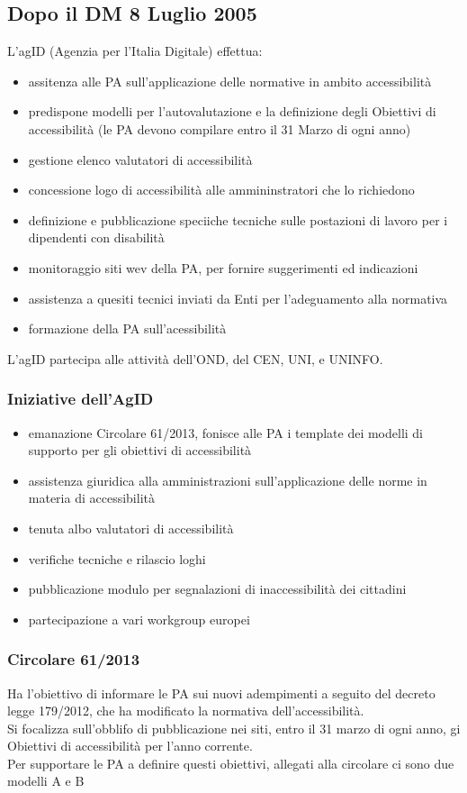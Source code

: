 \documentclass{article}
\begin{document}
\subsection{Dopo il DM 8 Luglio 2005}
L'agID (Agenzia per l'Italia Digitale) effettua:
\begin{itemize}
	\item assitenza alle PA sull'applicazione delle normative in ambito accessibilità
	\item predispone modelli per l'autovalutazione e la definizione degli Obiettivi di accessibilità (le PA devono compilare entro il 31 Marzo di ogni anno)
	\item gestione elenco valutatori di accessibilità
	\item concessione logo di accessibilità alle ammininstratori che lo richiedono
	\item definizione e pubblicazione speciiche tecniche sulle postazioni di lavoro per i dipendenti con disabilità
	\item monitoraggio siti wev della PA, per fornire suggerimenti ed indicazioni
	\item assistenza a quesiti tecnici inviati da Enti per l'adeguamento alla normativa
	\item formazione della PA sull'acessibilità
\end{itemize}
L'agID partecipa alle attività dell'OND, del CEN, UNI, e UNINFO.
\subsubsection{Iniziative dell'AgID}
\begin{itemize}
	\item emanazione Circolare 61/2013, fonisce alle PA i template dei modelli di supporto per gli obiettivi di accessibilità
	\item assistenza giuridica alla amministrazioni sull'applicazione delle norme in materia di accessibilità
	\item tenuta albo valutatori di accessibilità
	\item verifiche tecniche e rilascio loghi
	\item pubblicazione modulo per segnalazioni di inaccessibilità dei cittadini
	\item partecipazione a vari workgroup europei
	 
\end{itemize}
\subsubsection{Circolare 61/2013}
Ha l'obiettivo di informare le PA sui nuovi adempimenti a seguito del decreto legge 179/2012, che ha modificato la normativa dell'accessibilità.\\
Si focalizza sull'obblifo di pubblicazione nei siti, entro il 31 marzo di ogni anno, gi Obiettivi di accessibilità per l'anno corrente.\\
Per supportare le PA a definire questi obiettivi, allegati alla circolare ci sono due modelli A e B
\end{document}
